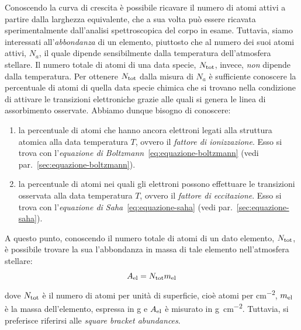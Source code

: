 Conoscendo la curva di crescita è possibile ricavare il numero di atomi attivi a partire dalla larghezza equivalente, che a sua volta può essere ricavata sperimentalmente dall'analisi spettroscopica del corpo in esame. Tuttavia, siamo interessati all'\emph{abbondanza} di un elemento, piuttosto che al numero dei suoi atomi attivi, $N_a$, il quale dipende sensibilmente dalla temperatura dell'atmosfera stellare. Il numero totale di atomi di una data specie, $N_\textup{tot}$, invece, \emph{non} dipende dalla temperatura. Per ottenere $N_\textup{tot}$ dalla misura di $N_a$ è sufficiente conoscere la percentuale di atomi di quella data specie chimica che si trovano nella condizione di attivare le transizioni elettroniche grazie alle quali si genera le linea di assorbimento osservate. Abbiamo dunque bisogno di conoscere:
\begin{enumerate}
    \item la percentuale di atomi che hanno ancora elettroni legati alla struttura atomica alla data temperatura $T$, ovvero il \emph{fattore di ionizzazione}. Esso si trova con l'\emph{equazione di Boltzmann}~\eqref{eq:equazione-boltzmann} (vedi par.~\ref{sec:equazione-boltzmann}).
    \item la percentuale di atomi nei quali gli elettroni possono effettuare le transizioni osservata alla data temperatura $T$, ovvero il \emph{fattore di eccitazione}. Esso si trova con l'\emph{equazione di Saha}~\eqref{eq:equazione-saha} (vedi par.~\ref{sec:equazione-saha}).
\end{enumerate} 

A questo punto, conoscendo il numero totale di atomi di un dato elemento, $N_\textup{tot}$, è possibile trovare la sua l'abbondanza in massa di tale elemento nell'atmosfera stellare:
\begin{equation}\label{eq:abbondanza-in-massa}
    A_\textup{el} = N_\textup{tot} m_\textup{el}
\end{equation}
dove $N_\textup{tot}$ è il numero di atomi per unità di superficie, cioè atomi per \si{cm^{-2}}, $m_\textup{el}$ è la massa dell'elemento, espressa in \si{g} e $A_\textup{el}$ è misurato in \si{g.cm^{-2}}. Tuttavia, si preferisce riferirsi alle \emph{square bracket abundances}.

